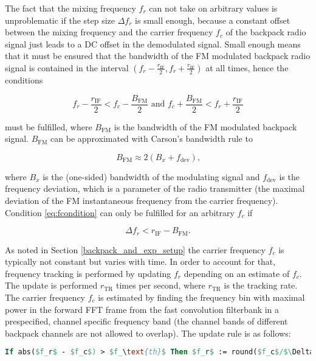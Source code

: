 \documentclass[10pt]{article}
\begin{document}
The fact that the mixing frequency $f_r$ can not take on arbitrary values is unproblematic if the step size $\Delta f_r$ is small enough, because a constant offset between the mixing frequency and the carrier frequency $f_c$ of the backpack radio signal just leads to a DC offset in the demodulated signal. Small enough means that it must be ensured that the bandwidth of the FM modulated backpack radio signal is contained in the interval $\left(f_r - \frac{r_\text{IF}}{2}, f_r + \frac{r_\text{IF}}{2}\right)$ at all times, hence the conditions 

\begin{equation}
\label{eq:fcondition}
f_r - \frac{r_\text{IF}}{2} < f_c - \frac{B_\text{FM}}{2} \text{ and } f_c + \frac{B_\text{FM}}{2} < f_r + \frac{r_\text{IF}}{2}
\end{equation}

must be fulfilled, where $B_\text{FM}$ is the bandwidth of the FM modulated backpack signal. $B_\text{FM}$ can be approximated with Carson's bandwidth rule to

\begin{equation}
B_\text{FM} \approx 2(B_x + f_\text{dev}) \text{,}
\end{equation}

where $B_x$ is the (one-sided) bandwidth of the modulating signal and $f_\text{dev}$ is the frequency deviation, which is a parameter of the radio transmitter (the maximal deviation of the FM instantaneous frequency from the carrier frequency). Condition \ref{eq:fcondition} can only be fulfilled for an arbitrary $f_c$ if

\begin{equation}
\Delta f_r < r_\text{IF} - B_\text{FM} \text{.}
\end{equation}

As noted in Section \ref{backpack_and_exp_setup} the carrier frequency $f_c$ is typically not constant but varies with time. In order to account for that, frequency tracking is performed by updating $f_r$ depending on an estimate of $f_c$. The update is performed $r_\text{TR}$ times per second, where $r_\text{TR}$ is the tracking rate. The carrier frequency $f_c$ is estimated by finding the frequency bin with maximal power in the forward FFT frame from the fast convolution filterbank in a prespecified, channel specific frequency band (the channel bands of different backpack channels are not allowed to overlap). The update rule is as follows:

\begin{lstlisting}[language=Pascal, mathescape=true]   
If abs($f_r$ - $f_c$) > $f_\text{th}$ Then $f_r$ := round($f_c$/$\Delta f_r$)*$\Delta f_r$;
\end{lstlisting}
\bigskip \bigskip
\end{document}
